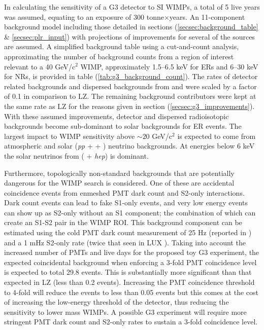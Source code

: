 In calculating the sensitivity of a G3 detector to SI WIMPs, a total of 5 live years was assumed, equating to an exposure of 300 tonne$\times$years. An 11-component background model including those detailed in sections (\ref{secsec:background_table} \& \ref{secsec:plr_input}) with projections of improvements for several of the sources are assumed. A simplified background table using a cut-and-count analysis, approximating the number of background counts from a region of interest relevant to a 40 GeV/c$^{2}$ WIMP, approximately 1.5--6.5 keV for ERs and 6--30 keV for NRs, is provided in table (\ref{tab:g3_background_count}). The rates of detector related backgrounds and dispersed backgrounds from \RnTTT{} and \RnTTZ{} were scaled by a factor of 0.1 in comparison to LZ. The remaining background contributors were kept at the same rate as LZ for the reasons given in section (\ref{secsec:g3_improvements}). With these assumed improvements, detector and dispersed radioisotopic backgrounds become sub-dominant to solar backgrounds for ER events. The largest impact to WIMP sensitivity above $\sim20$ GeV/c$^{2}$ is expected to come from atmospheric and solar (\textit{pp} + \BeS{} + \NOT{}) neutrino backgrounds. At energies below 6 keV the solar neutrinos from (\BE{} $+$ \textit{hep}) is dominant. 

Furthermore, topologically non-standard backgrounds that are potentially dangerous for the WIMP search is considered. One of these are accidental coincidence events from enmeshed PMT dark count and S2-only interactions. Dark count events can lead to fake S1-only events, and very low energy events can show up as S2-only without an S1 component; the combination of which can create an S1-S2 pair in the WIMP ROI. This background component can be estimated using the cold PMT dark count measurement of 25 Hz (reported in \cite{Aprile_2017}) and a 1 mHz S2-only rate (twice that seen in LUX \cite{Akerib_2016}). Taking into account the increased number of PMTs and live days for the proposed toy G3 experiment, the expected coincidental background when enforcing a 3-fold PMT coincidence level is expected to total 29.8 events. This is substantially more significant than that expected in LZ (less than 0.2 events). Increasing the PMT coincidence threshold to 4-fold will reduce the events to less than 0.05 events but this comes at the cost of increasing the low-energy threshold of the detector, thus reducing the sensitivity to lower mass WIMPs. A possible G3 experiment will require more stringent PMT dark count and S2-only rates to sustain a 3-fold coincidence level. 

